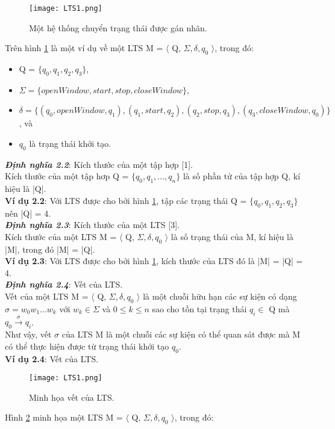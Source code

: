 \documentclass[a4paper,13pt,oneside,openany]{book}
\begin{document}
\begin{flushleft}
\begin{figure}[h]
			\texttt{[image: LTS1.png]}
			\caption{Một hệ thống chuyển trạng thái được gán nhãn.}
			\label{fig:LTS1}
		\end{figure}
		Trên hình \ref{fig:LTS1} là một ví dụ về một LTS M = $\langle$ Q, $\Sigma, \delta, q_{0}$ $\rangle$, trong đó:
		\begin{itemize}
			\item Q = $\{q_0, q_1, q_2, q_3\}$,
			\item $\Sigma = \{openWindow, start, stop, closeWindow\}$,
			\item $\delta = \{(q_0, openWindow, q_1), (q_1, start, q_2), (q_2, stop, q_3), (q_3, closeWindow, q_0)\}$, và
			\item $q_0$ là trạng thái khởi tạo.
		\end{itemize}
		\textbf{\textit{Định nghĩa 2.2}}: Kích thước của một tập hợp [1].\\
		Kích thước của một tập hơp Q = $\{q_0, q_1, ..., q_n\}$ là số phần tử của tập hợp Q, kí hiệu là |Q|.\\
		\textbf{Ví dụ 2.2}: Với LTS được cho bởi hình \ref{fig:LTS1}, tập các trạng thái Q = $\{q_0, q_1, q_2, q_3\}$ nên |Q| = 4.\\
		\textbf{\textit{Định nghĩa 2.3}}: Kích thước của một LTS [3].\\
		Kích thước của một LTS M = $\langle$ Q, $\Sigma, \delta, q_{0}$ $\rangle$ là số trạng thái của M, kí hiệu là |M|, trong đó |M| = |Q|.\\
		\textbf{Ví dụ 2.3}: Với LTS được cho bởi hình \ref{fig:LTS1}, kích thước của LTS đó là |M| = |Q| = 4.\\
		\textbf{\textit{Định nghĩa 2.4}}: Vết của LTS.\\
		Vết của một LTS M = $\langle$ Q, $\Sigma, \delta, q_{0}$ $\rangle$ là một chuỗi hữu hạn các sự kiện có dạng $\sigma = w_0w_1...w_k$ với $w_k \in \Sigma$ và $0 \leq k \leq n$ sao cho tồn tại trạng thái $q_i \in$ Q mà $q_0 \overset{\sigma}{\longrightarrow} q_{i}$.\\
		Như vậy, vết $\sigma$ của LTS M là một chuỗi các sự kiện có thể quan sát được mà M có thể thực hiện được từ trạng thái khởi tạo $q_0$.\\
		\textbf{Ví dụ 2.4}: Vết của LTS.\\
		\begin{figure}[h]
			\centering
			\texttt{[image: LTS1.png]}
			\caption{Minh họa vết của LTS.}
			\label{fig:LTS2}
		\end{figure}
		Hình \ref{fig:LTS2} minh họa một LTS M = $\langle$ Q, $\Sigma, \delta, q_{0}$ $\rangle$, trong đó:

\end{flushleft}
\end{document}
